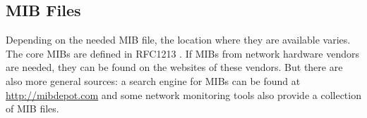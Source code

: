 \subsection{MIB Files}
\label{Section:MIB-MIB_Files}

Depending on the needed MIB file, the location where they are available varies. The core MIBs are defined in RFC1213 \cite{RFC:RFC1213:1991}. If MIBs from network hardware vendors are needed, they can be found on the websites of these vendors. But there are also more general sources: a search engine for MIBs can be found at \url{http://mibdepot.com} and some network monitoring tools also provide a collection of MIB files.
